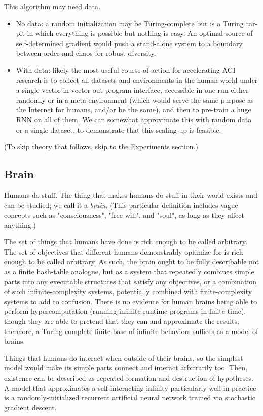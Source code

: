 \documentclass{article}
\begin{document}
This algorithm may need data.
\begin{itemize}
\item No data: a random initialization may be Turing-complete but is a Turing tar-pit \cite{10.1145/947955.1083808} in which everything is possible but nothing is easy. An optimal source of self-determined gradient would push a stand-alone system to a boundary between order and chaos \cite{feng2020optimal} for robust diversity.
\item With data: likely the most useful course of action for accelerating AGI research is to collect all datasets and environments in the human world under a single vector-in vector-out program interface, accessible in one run either randomly or in a meta-environment (which would serve the same purpose as the Internet for humans, and/or be the same), and then to pre-train a huge RNN on all of them. We can somewhat approximate this with random data or a single dataset, to demonstrate that this scaling-up is feasible.
\end{itemize}

(To skip theory that follows, skip to the Experiments section.)

\subsection{Brain}

Humans do stuff. The thing that makes humans do stuff in their world exists and can be studied; we call it a \textit{brain}. (This particular definition includes vague concepts such as "consciousness", "free will", and "soul", as long as they affect anything.)

The set of things that humans have done is rich enough to be called arbitrary. The set of objectives that different humans demonstrably optimize for is rich enough to be called arbitrary. As such, the brain ought to be fully describable not as a finite hash-table analogue, but as a system that repeatedly combines simple parts into any executable structures that satisfy any objectives, or a combination of such infinite-complexity systems, potentially combined with finite-complexity systems to add to confusion. There is no evidence for human brains being able to perform hypercomputation (running infinite-runtime programs in finite time), though they are able to pretend that they can and approximate the results; therefore, a Turing-complete finite base of infinite behaviors suffices as a model of brains.

Things that humans do interact when outside of their brains, so the simplest model would make its simple parts connect and interact arbitrarily too. Then, existence can be described as repeated formation and destruction of hypotheses. A model that approximates a self-interacting infinity particularly well in practice is a randomly-initialized recurrent artificial neural network trained via stochastic gradient descent.
\end{document}
